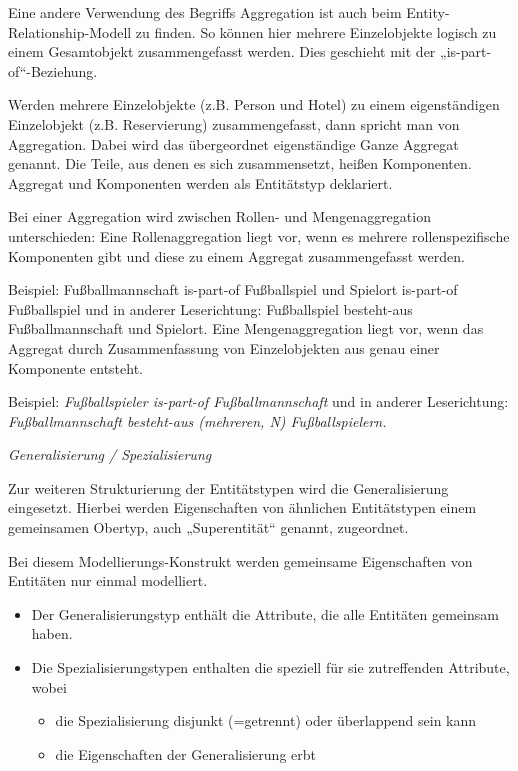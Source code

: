 Eine andere Verwendung des Begriffs Aggregation ist auch beim Entity-Relationship-Modell zu finden. So können hier mehrere Einzelobjekte logisch zu einem Gesamtobjekt zusammengefasst werden. Dies geschieht mit der „is-part-of“-Beziehung.

Werden mehrere Einzelobjekte (z.B. Person und Hotel) zu einem eigenständigen Einzelobjekt (z.B. Reservierung) zusammengefasst, dann spricht man von Aggregation. Dabei wird das übergeordnet eigenständige Ganze Aggregat genannt. Die Teile, aus denen es sich zusammensetzt, heißen Komponenten. Aggregat und Komponenten werden als Entitätstyp deklariert.

Bei einer Aggregation wird zwischen Rollen- und Mengenaggregation unterschieden:
Eine Rollenaggregation liegt vor, wenn es mehrere rollenspezifische Komponenten gibt und diese zu einem Aggregat zusammengefasst werden.

Beispiel: 
Fußballmannschaft is-part-of Fußballspiel und Spielort is-part-of Fußballspiel
 	und in anderer Leserichtung:
Fußballspiel besteht-aus Fußballmannschaft und Spielort.
Eine Mengenaggregation liegt vor, wenn das Aggregat durch Zusammenfassung von Einzelobjekten aus genau einer Komponente entsteht.

Beispiel:
\textit{Fußballspieler is-part-of Fußballmannschaft} \newline
 	und in anderer Leserichtung: \newline
\textit{Fußballmannschaft besteht-aus (mehreren, N) Fußballspielern.}

\textit{Generalisierung / Spezialisierung}

Zur weiteren Strukturierung der Entitätstypen wird die Generalisierung eingesetzt. Hierbei werden Eigenschaften von ähnlichen Entitätstypen einem gemeinsamen Obertyp, auch „Superentität“ genannt, zugeordnet. 

Bei diesem Modellierungs-Konstrukt werden gemeinsame Eigenschaften von Entitäten nur einmal modelliert.

\begin{itemize}
    \item Der Generalisierungstyp enthält die Attribute, die alle Entitäten gemeinsam haben.
    \item Die Spezialisierungstypen enthalten die speziell für sie zutreffenden Attribute, wobei
    \begin{itemize}
        \item die Spezialisierung disjunkt (=getrennt) oder überlappend sein kann
        \item die Eigenschaften der Generalisierung erbt
    \end{itemize}
\end{itemize}

